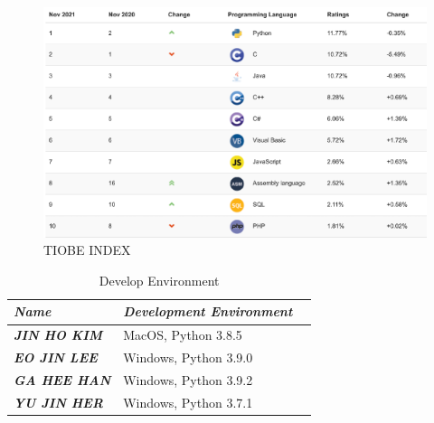 \documentclass[conference]{IEEEtran}
\begin{document}
\begin{figure}[]
\centerline{\includegraphics{assets/그림12png.png}}
\caption{TIOBE INDEX}
\label{fig}
\end{figure}


\begin{table}[ht]
    \centering
    \begin{tabularx}{\columnwidth}{X|X}
    \hline
    \textit{\textbf{Name}} & \textit{\textbf{Development Environment}}
     & & \\ \hline
    \textit{\textbf{JIN HO KIM}} & MacOS, Python 3.8.5    
     & & \\ \hline
    \textit{\textbf{EO JIN LEE}} & Windows, Python 3.9.0
     & & \\ \hline
    \textit{\textbf{GA HEE HAN}} & Windows, Python 3.9.2
     & & \\ \hline
    \textit{\textbf{YU JIN HER}} & Windows, Python 3.7.1
     & & \\ \hline
    \end{tabularx}
    \renewcommand{\thetable}{\arabic{table}}
    \caption{Develop Environment}
    \label{tab:table}
\end{table}
\break
\end{document}
